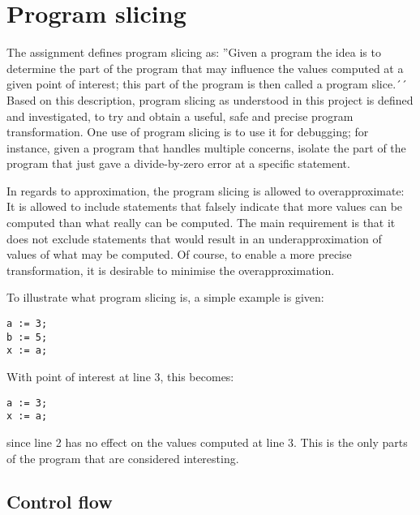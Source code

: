 \section{Program slicing}

The assignment defines program slicing  as:
''Given a program the idea is to determine the part of the program that may influence the values
computed at a given point of interest; this part of the program is then called a program slice.´´
Based on this description, program slicing as understood in this project is defined and investigated,
to try and obtain a useful, safe and precise program transformation.
One use of program slicing is to use it for debugging; for instance, given a program that handles
multiple concerns, isolate the part of the program that just gave a divide-by-zero error at a
specific statement.

In regards to approximation, the program slicing is allowed to overapproximate: It is allowed to include statements
that falsely indicate that more values can be computed than what really can be computed.
The main requirement is that it does not exclude statements that would result in an underapproximation
of values of what may be computed. Of course, to enable a more precise transformation, it is desirable
to minimise the overapproximation.

To illustrate what program slicing is, a simple example is given:
\begin{lstlisting}
a := 3;
b := 5;
x := a;
\end{lstlisting}
With point of interest at line 3, this becomes:
\begin{lstlisting}
a := 3;
x := a;
\end{lstlisting}
since line 2 has no effect on the values computed at line 3.
This is the only parts of the program that are considered interesting.

\subsection{Control flow}

